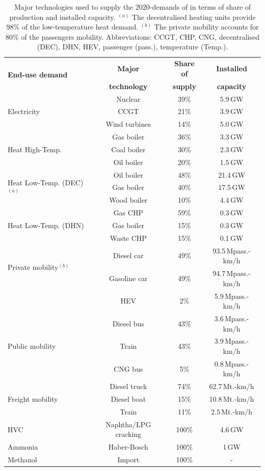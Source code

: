 \documentclass[11pt,twoside,a4paper,english]{article}
\begin{document}
\begin{appendices}
\begin{table}[htbp]
\caption{Major technologies used to supply the 2020-demands of  in terms of share of production and installed capacity. $^{(a)}$ The decentralised heating units provide 98\% of the low-temperature heat demand. $^{(b)}$ The private mobility accounts for 80\% of the passengers mobility. Abbreviations: \acrfull{CCGT}, \acrfull{CHP}, \acrfull{CNG}, decentralised (DEC), \acrfull{DHN}, \acrfull{HEV}, passenger (pass.), temperature (Temp.).}
\label{tab:Belgium_2020}
\begin{minipage}{\linewidth}
\centering
\begin{tabular}{l c c c}
\toprule
\multirow{2}{*}{\textbf{End-use demand}} & \textbf{Major} & \textbf{Share of} & \textbf{Installed}\\
    &	 \textbf{technology} 	& \textbf{supply} & \textbf{capacity}	 \\ 	
\midrule							
\multirow{3}{*}{Electricity}
 & Nuclear & 39\% & 5.9\,GW\\
 & CCGT & 21\% & 3.9\,GW\\
 & Wind turbines & 14\% & 5.0\,GW\\
\midrule
\multirow{3}{*}{Heat High-Temp.}
 & Gas boiler & 36\% & 3.3\,GW\\
 & Coal boiler & 30\% & 2.3\,GW\\
 & Oil boiler & 20\% & 1.5\,GW\\
\midrule
\multirow{3}{*}{Heat Low-Temp. (DEC)$^{(a)}$}
 & Oil boiler & 48\% & 21.4\,GW\\
 & Gas boiler & 40\% & 17.5\,GW\\
 & Wood boiler & 10\% & 4.4\,GW\\
\midrule
\multirow{3}{*}{Heat Low-Temp. (DHN)}
 & Gas CHP & 59\% & 0.3\,GW\\
 & Gas boiler & 15\% & 0.3\,GW\\
 & Waste CHP & 15\% & 0.1\,GW\\
\midrule
\multirow{2}{*}{Private mobility$^{(b)}$}
 & Diesel car & 49\% & 93.5\,Mpass.-km/h\\
 & Gasoline car & 49\% & 94.7\,Mpass.-km/h\\
 & HEV & 2\% & 5.9\,Mpass.-km/h\\
\midrule
\multirow{3}{*}{Public mobility}
 & Diesel bus & 43\% & 3.6\,Mpass.-km/h\\
 & Train & 43\% & 3.9\,Mpass.-km/h\\
 & CNG bus & 5\% & 0.8\,Mpass.-km/h\\
\midrule
\multirow{3}{*}{Freight mobility}
 & Diesel truck & 74\% & 62.7\,Mt.-km/h\\
 & Diesel boat & 15\% & 10.8\,Mt.-km/h\\
 & Train & 11\% & 2.5\,Mt.-km/h\\
\midrule
HVC & Naphtha/LPG cracking & 100\% & 4.6\,GW\\
Ammonia & Haber-Bosch & 100\% & 1\,GW\\
Methanol & Import & 100\% & -\\
\bottomrule							
\end{tabular}
\end{minipage}
\end{table}


\end{appendices}
\end{document}
